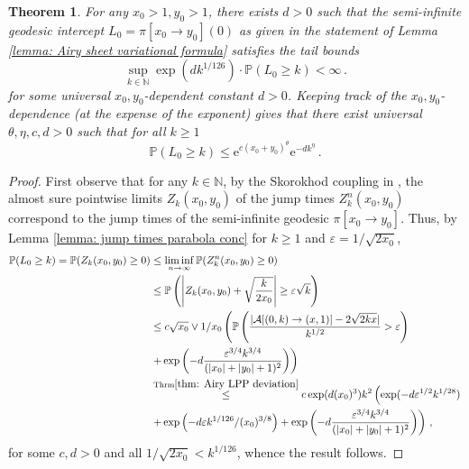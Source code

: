 \documentclass[11pt, reqno]{amsart}
\numberwithin{equation}{section}
\newcounter{dummy} \numberwithin{dummy}{section}
\newtheorem{theorem}[dummy]{Theorem}
\newcommand{\N}{\ensuremath{\mathbb{N}}}
\newcommand{\PP}{\ensuremath{\mathbb{P}}}
\begin{document}
\begin{theorem}\label{thm: intercept tail bound}
For any $x_0>1, y_0>1$, there exists  $d>0$ such that the semi-infinite geodesic intercept $L_0 = \pi[x_0\to y_0](0)$ as given in the statement of Lemma \ref{lemma: Airy sheet variational formula} satisfies the tail bounds
    \begin{equation*}
        \displaystyle\sup_{k\in \N} \exp(dk^{1/126})\cdot \PP(L_0\geq k)<\infty\,.
    \end{equation*}
for some universal $x_0, y_0$-dependent constant $d>0$. Keeping track of the $x_0, y_0$-dependence (at the expense of the exponent) gives that there exist universal $\theta , \eta, c,d > 0$ such that for all $k\ge 1$
 \begin{equation*}
        \PP(L_0\geq k)\le \mathrm{e}^{c(x_0+y_0)^\theta}\mathrm{e}^{-dk^{\eta}}\,.
    \end{equation*}
    \end{theorem}

\begin{proof}
    First observe that for any $k\in \N$, by the Skorokhod coupling in \cite[p.43]{DOV}, the almost sure pointwise limits  $Z_k(x_0,y_0)$ of the jump times $Z^n_k(x_0,y_0)$ correspond to the jump times of the semi-infinite geodesic $\pi[x_0 \to y_0]$. Thus, by Lemma \ref{lemma: jump times parabola conc} for $k\ge 1$ and $\varepsilon = 1/\sqrt{2x_0}$,
    \begin{align*}
        \PP(L_0\ge k) = \PP(Z_k(x_0,y_0)\ge 0)&\le \displaystyle\liminf_{n\to \infty}\PP(Z^n_k(x_0,y_0)\ge 0)\\
        & \le \PP\left( \left|Z_k(x_0,y_0) +\sqrt{\frac{k}{2x_0}}\right| \ge \varepsilon \sqrt{k}\right)\\
        &\le c\sqrt{x_0}\lor 1/x_0 \left( \PP \left(\frac{|\mathcal{A}[ (0, k) \rightarrow (x,1) ]-{2\sqrt{2kx}}|}{k^{1/2}} > \varepsilon\right)\right.\\
        &\left.+  \exp\left(-d\frac{\varepsilon^{3/4} k^{3/4}}{(|x_0| + |y_0| + 1)^2}\right)\right)\\
        & \stackrel{\mathrm{Thrm} \ref{thm: Airy LPP deviation}}{\le} c\exp(d (x_0)^3)k^2\left(\exp(-d\varepsilon^{1/2}  k^{1/28})\right.\\
        &\left. + \exp\left(-d\varepsilon k^{1/126}/(x_0)^{3/8}\right)+ \exp\left(-d\frac{\varepsilon^{3/4} k^{3/4}}{(|x_0| + |y_0| + 1)^2}\right)\right)\,,
    \end{align*}
    for some $c,d>0$ and all $1/\sqrt{2x_0}< k ^{1/126}$, whence the result follows.
\end{proof}
\end{document}
